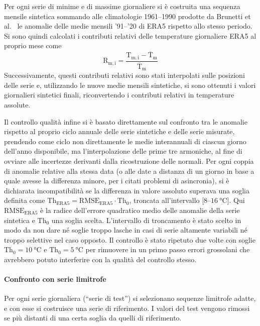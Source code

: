 Per ogni serie di minime e di massime giornaliere si è costruita una sequenza mensile sintetica sommando alle climatologie 1961--1990 prodotte da Brunetti et al.~\cite{brunettiHighresolutionTemperatureClimatology2014} le anomalie delle medie mensili '91--'20 di ERA5 rispetto allo stesso periodo. Si sono quindi calcolati i contributi relativi delle temperature giornaliere ERA5 al proprio mese come
\[\mathrm{R_{m,i}} = \frac{\mathrm{T_{m,i}} - \mathrm{\overline{T}_m}}{\mathrm{\overline{T}_m}}\]
Successivamente, questi contributi relativi sono stati interpolati sulle posizioni delle serie e, utilizzando le nuove medie mensili sintetiche, si sono ottenuti i valori giornalieri sintetici finali, riconvertendo i contributi relativi in temperature assolute.

Il controllo qualità infine si è basato direttamente sul confronto tra le anomalie rispetto al proprio ciclo annuale delle serie sintetiche e delle serie misurate, prendendo come ciclo non direttamente le medie interannuali di ciascun giorno dell'anno disponibile, ma l'interpolazione delle prime tre armoniche, al fine di ovviare alle incertezze derivanti dalla ricostruzione delle normali. Per ogni coppia di anomalie relative alla stessa data (o alle date a distanza di un giorno in base a quale avesse la differenza minore, per i citati problemi di asincronia), si è dichiarata incompatibilità se la differenza in valore assoluto superava una soglia definita come \(\mathrm{Th_{ERA5}} = \mathrm{RMSE_{ERA5}}\cdot\mathrm{Th_0}\), troncata all'intervallo [\(\num{8}\)--\(\qty{16}{\degreeCelsius}]\). Qui \(\mathrm{RMSE_{ERA5}}\) è la radice dell'errore quadratico medio delle anomalie della serie sintetica e \(\mathrm{Th_0}\) una soglia scelta. L'intervallo di troncamento è stato scelto in modo da non dare né soglie troppo lasche in casi di serie altamente variabili né troppo selettive nel caso opposto. Il controllo è stato ripetuto due volte con soglie \(\mathrm{Th_0} = \qty{10}{\degreeCelsius}\) e \(\mathrm{Th_0} = \qty{5}{\degreeCelsius}\) per rimuovere in un primo passo errori grossolani che avrebbero potuto interferire con la qualità del controllo stesso.

\paragraph{Confronto con serie limitrofe}
Per ogni serie giornaliera (``serie di test'') si selezionano sequenze limitrofe adatte, e con esse si costruisce una serie di riferimento. I valori del test vengono rimossi se più distanti di una certa soglia da quelli di riferimento.

